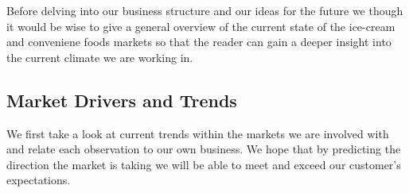 \documentclass{article}
\begin{document}
  Before delving into our business structure and our ideas for the future we though it would be wise to give a general overview of the current state of the ice-cream and conveniene foods markets so that the reader can gain a deeper insight into the current climate we are working in.

  \subsection{Market Drivers and Trends}

   We first take a look at current trends within the markets we are involved with and relate each observation to our own business. We hope that by predicting the direction the market is taking we will be able to meet and exceed our customer's expectations.
   
\end{document}
